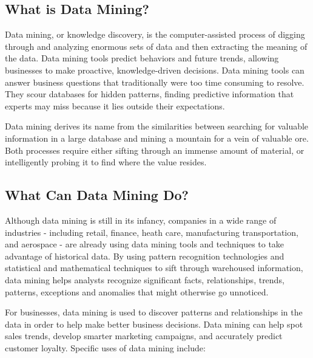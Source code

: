 \documentclass[12pt]{article}
\begin{document}
\subsection{What is Data Mining?}
Data mining, or knowledge discovery, is the computer-assisted process of digging through and analyzing enormous sets of data and then extracting the meaning of the data. Data mining tools predict behaviors and future trends, allowing businesses to make proactive, knowledge-driven decisions. Data mining tools can answer business questions that traditionally were too time consuming to resolve. They scour databases for hidden patterns, finding predictive information that experts may miss because it lies outside their expectations.

Data mining derives its name from the similarities between searching for valuable information in a large database and mining a mountain for a vein of valuable ore. Both processes require either sifting through an immense amount of material, or intelligently probing it to find where the value resides.

\subsection{What Can Data Mining Do?}
Although data mining is still in its infancy, companies in a wide range of industries - including retail, finance, heath care, manufacturing transportation, and aerospace - are already using data mining tools and techniques to take advantage of historical data. By using pattern recognition technologies and statistical and mathematical techniques to sift through warehoused information, data mining helps analysts recognize significant facts, relationships, trends, patterns, exceptions and anomalies that might otherwise go unnoticed.

For businesses, data mining is used to discover patterns and relationships in the data in order to help make better business decisions. Data mining can help spot sales trends, develop smarter marketing campaigns, and accurately predict customer loyalty. Specific uses of data mining include:
\end{document}
